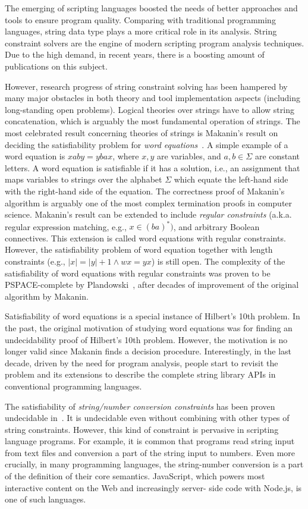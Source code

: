 
The emerging of scripting languages boosted the needs of better approaches and tools to ensure program quality.
Comparing with traditional programming languages, string data type plays a more critical role in its analysis.
String constraint solvers are the engine of modern scripting program analysis techniques. 
Due to the high demand, in recent years, there is a boosting amount of publications on this subject.

However, research progress of string constraint solving has been hampered by many major obstacles in both theory and tool implementation aspects (including long-standing open problems). 
Logical theories over strings have to allow string concatenation, which is arguably the most fundamental operation of strings. 
The most celebrated result concerning theories of strings is Makanin’s result on deciding the satisfiability problem for \emph{word equations}~\cite{makanin77}.
A simple example of a word equation is $xaby = ybax$, where $x, y$ are variables, and $a, b \in \Sigma$ are constant letters. 
A word equation is satisfiable if it has a solution, i.e., an assignment that maps variables to strings over the alphabet $\Sigma$ which equate the left-hand side with the right-hand side of the equation.
The correctness proof of Makanin’s algorithm is arguably one of the most complex termination proofs in computer science. 
Makanin’s result can be extended to include \emph{regular constraints} (a.k.a. regular expression matching, e.g., $x \in (ba)^*)$, and arbitrary Boolean connectives.
This extension is called word equations with regular constraints. 
However, the satisfiability problem of word equation together with length constraints (e.g., $|x|=|y|+1 \wedge wx=yx$) is still open.
The complexity of the satisfiability of word equations with regular constraints was proven to be PSPACE-complete by Plandowski~\cite{plandowski99}, after decades of improvement of the original algorithm by Makanin.

Satisfiability of word equations is a special instance of Hilbert’s 10th problem. 
In the past, the original motivation of studying word equations was for finding an undecidability proof of Hilbert’s 10th problem. 
However, the motivation is no longer valid since Makanin finds a decision procedure. Interestingly, in the last decade, driven by the need for program analysis, people start to revisit the problem and its extensions to describe the complete string library APIs in conventional programming languages.

The satisfiability of \emph{string/number conversion constraints}  has been proven undecidable in~\cite{}. 
It is undecidable even without combining with other types of string constraints. 
However, this kind of constraint is pervasive in scripting language programs. 
For example, it is common that programs read string input from text files and conversion a part of the string input to numbers.
Even more crucially, in many programming languages, the string-number conversion is a part of the definition of their core semantics. 
JavaScript, which powers most interactive content on the Web and increasingly server- side code with Node.js, is one of such languages. 

